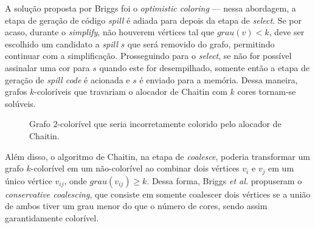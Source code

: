\documentclass[
	12pt,				%
	openright,			%
	oneside,			%
	a4paper,			%
	tccpreliminar,			%
	]{ABNT-DC-UEL}
\begin{document}
A solução proposta por Briggs foi o \textit{optimistic coloring} --- nessa abordagem, a etapa de geração de código \textit{spill} é adiada para depois da etapa de \textit{select}. Se por acaso, durante o \textit{simplify}, não houverem vértices tal que $grau(v)<k$, deve ser escolhido um candidato a \textit{spill} $s$ que será removido do grafo, permitindo continuar com a simplificação. Prosseguindo para o \textit{select}, se não for possível assinalar uma cor para $s$ quando este for desempilhado, somente então a etapa de geração de \textit{spill code} é acionada e $s$ é enviado para a memória. Dessa maneira, grafos $k$-coloríveis que travariam o alocador de Chaitin com $k$ cores tornam-se solúveis.

\begin{figure}
    \centering
    \caption{Grafo $2$-colorível que seria incorretamente colorido pelo alocador de Chaitin.}
    \label{fig:7}
\end{figure}

Além disso, o algoritmo de Chaitin, na etapa de \textit{coalesce}, poderia transformar um grafo $k$-colorível em um não-colorível ao combinar dois vértices $v_i$ e $v_j$ em um único vértice $v_{ij}$, onde $grau(v_{ij})\geq k$. Dessa forma, Briggs \textit{et al.} \cite{briggs2:92} propuseram o \textit{conservative coalescing}, que consiste em somente coalescer dois vértices se a união de ambos tiver um grau menor do que o número de cores, sendo assim garantidamente colorível.
\end{document}
